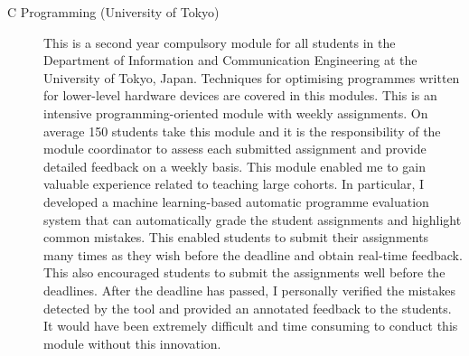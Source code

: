 \documentclass[a4paper,11pt]{article}
\begin{document}
\begin{description}
\item[C Programming (University of Tokyo)]
This is a second year compulsory module for all students in the Department of Information and Communication Engineering at the University of Tokyo, Japan. Techniques for optimising programmes written for lower-level hardware devices are covered in this modules.
This is an intensive programming-oriented module with weekly assignments. On average 150 students take this module and it is the responsibility of the module coordinator to assess each submitted assignment and provide detailed feedback on a weekly basis. 
This module enabled me to gain valuable experience related to teaching large cohorts. 
In particular, I developed a machine learning-based automatic programme evaluation system that can automatically grade the student assignments and highlight common mistakes. This enabled students to submit their assignments many times as they wish before the deadline and obtain real-time feedback. This also encouraged students to submit the assignments well before the deadlines.
After the deadline has passed, I personally verified the mistakes detected by the tool and provided an annotated feedback to the students.
It would have been extremely difficult and time consuming to conduct this module without this innovation.

\end{description}
\end{document}
